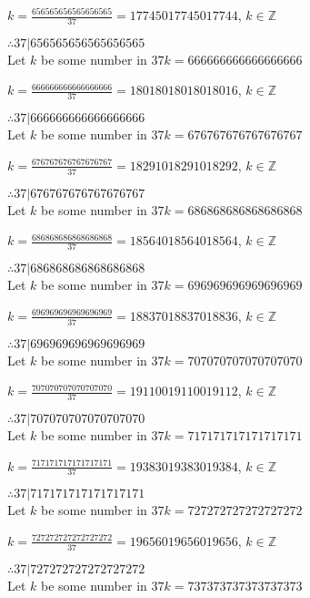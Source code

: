 \documentclass{article}
\begin{document}
$k = \frac{656565656565656565}{37} = 17745017745017744$, $k \in \mathbb{Z}$

$ \therefore  37|656565656565656565 $ \\

Let $k$ be some number in $37k = 666666666666666666$

$k = \frac{666666666666666666}{37} = 18018018018018016$, $k \in \mathbb{Z}$

$ \therefore  37|666666666666666666 $ \\

Let $k$ be some number in $37k = 676767676767676767$

$k = \frac{676767676767676767}{37} = 18291018291018292$, $k \in \mathbb{Z}$

$ \therefore  37|676767676767676767 $ \\

Let $k$ be some number in $37k = 686868686868686868$

$k = \frac{686868686868686868}{37} = 18564018564018564$, $k \in \mathbb{Z}$

$ \therefore  37|686868686868686868 $ \\

Let $k$ be some number in $37k = 696969696969696969$

$k = \frac{696969696969696969}{37} = 18837018837018836$, $k \in \mathbb{Z}$

$ \therefore  37|696969696969696969 $ \\

Let $k$ be some number in $37k = 707070707070707070$

$k = \frac{707070707070707070}{37} = 19110019110019112$, $k \in \mathbb{Z}$

$ \therefore  37|707070707070707070 $ \\

Let $k$ be some number in $37k = 717171717171717171$

$k = \frac{717171717171717171}{37} = 19383019383019384$, $k \in \mathbb{Z}$

$ \therefore  37|717171717171717171 $ \\

Let $k$ be some number in $37k = 727272727272727272$

$k = \frac{727272727272727272}{37} = 19656019656019656$, $k \in \mathbb{Z}$

$ \therefore  37|727272727272727272 $ \\

Let $k$ be some number in $37k = 737373737373737373$
\end{document}
